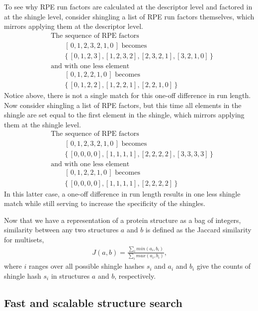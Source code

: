 \documentclass[a4,center,fleqn]{NAR}
\begin{document}
To see why RPE run factors are calculated at the descriptor level and factored in at the shingle level, consider shingling a list of RPE run factors themselves, which mirrors applying them at the descriptor level. 
\begin{align*}
    &\text{The sequence of RPE factors} \\
    &\qquad[\, 0, 1, 2, 3, 2, 1, 0 \,] \text{ becomes} \\
    &\qquad\{\, [0, 1, 2, 3], [1, 2, 3, 2], [2, 3, 2, 1], [3, 2, 1, 0] \,\} \\
    &\text{and with one less element} \\
    &\qquad[\, 0, 1, 2, 2, 1, 0 \,] \text{ becomes} \\
    &\qquad\{\, [0, 1, 2, 2], [1, 2, 2, 1], [2, 2, 1, 0] \,\}
\end{align*}
Notice above, there is not a single match for this one-off difference in run length.
Now consider shingling a list of RPE factors, but this time all elements in the shingle are set equal to the first element in the shingle, which mirrors applying them at the shingle level. 
\begin{align*}
    &\text{The sequence of RPE factors} \\
    &\qquad[\, 0, 1, 2, 3, 2, 1, 0 \,] \text{ becomes} \\
    &\qquad\{\, [0, 0, 0, 0], [1, 1, 1, 1], [2, 2, 2, 2], [3, 3, 3, 3] \,\} \\
    &\text{and with one less element} \\
    &\qquad[\, 0, 1, 2, 2, 1, 0 \,] \text{ becomes} \\
    &\qquad\{\, [0, 0, 0, 0], [1, 1, 1, 1], [2, 2, 2, 2] \,\}
\end{align*}
In this latter case, a one-off difference in run length results in one less shingle match while still serving to increase the specificity of the shingles. 

Now that we have a representation of a protein structure as a bag of integers, similarity between any two structures $a$ and $b$ is defined as the Jaccard similarity \cite{Levan1971} for multisets,
\begin{align}
    J(a,b) = \frac{\sum_i min(a_i, b_i)}{\sum_i max(a_i,b_i)}\text{,}
\end{align}
where $i$ ranges over all possible shingle hashes $s_i$ and $a_i$ and $b_i$ give the counts of shingle hash $s_i$ in structures $a$ and $b$, respectively. 

\subsection{Fast and scalable structure search}
\end{document}
